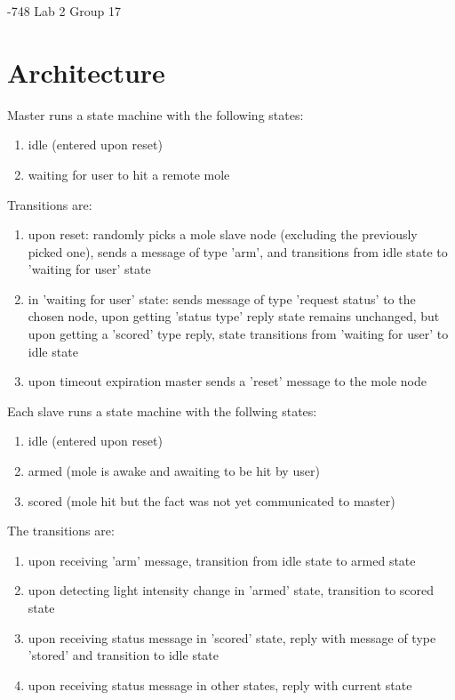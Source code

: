\documentclass{article}
\begin{document}
-748 Lab 2 \hfill Group 17

\noindent \hrulefill

\section*{Architecture}

Master runs a state machine with the following states:
\begin{enumerate}
\item idle (entered upon reset)
\item waiting for user to hit a remote mole
\end{enumerate}

Transitions are:
\begin{enumerate}
\item upon reset: randomly picks a mole slave node (excluding the previously
picked one), sends a message of type 'arm', and transitions from idle
state to 'waiting for user' state
\item in 'waiting for user' state: sends message of type 'request status'
to the chosen node, upon getting 'status type' reply state remains unchanged,
but upon getting a 'scored' type reply, state transitions from 'waiting for
user' to idle state
\item upon timeout expiration master sends a 'reset' message to the mole node
\end{enumerate}

Each slave runs a state machine with the follwing states:
\begin{enumerate}
\item idle (entered upon reset)
\item armed (mole is awake and awaiting to be hit by user)
\item scored (mole hit but the fact was not yet communicated to master)
\end{enumerate}

The transitions are:
\begin{enumerate}
\item upon receiving 'arm' message, transition from idle state to armed state
\item upon detecting light intensity change in 'armed' state, transition
to scored state
\item upon receiving status message in 'scored' state, reply with message
of type 'stored' and transition to idle state
\item upon receiving status message in other states, reply with current state
\end{enumerate}
\end{document}
